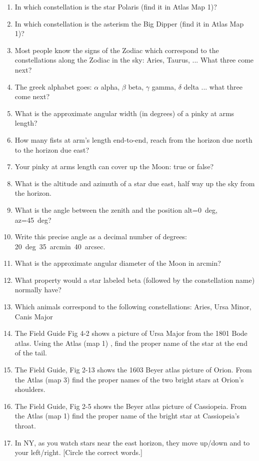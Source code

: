 \documentclass{article}
\begin{document}
\begin{enumerate} 
\item 
In which constellation is the star Polaris (find it in Atlas Map 1)?
\item
In which constellation is the asterism the Big Dipper (find it in
Atlas Map 1)?
\item
Most people know the signs of the Zodiac which correspond to the
constellations along the Zodiac in the sky: Aries, Taurus, ... What
three come next?
\item
The greek alphabet goes: $\alpha$ alpha, $\beta$ beta, $\gamma$ gamma,
$\delta$ delta ... what three come next?
\item
What is the approximate angular width (in degrees) of a pinky at arms
length?
\item
How many fists at arm's length end-to-end, reach from the horizon due
north to the horizon due east?
\item
Your pinky at arms length can cover up the Moon: true or false?
\item
What is the altitude and azimuth of a star due east, half way up the
sky from the horizon.
\item
What is the angle between the zenith and the position alt=0~deg,
az=45~deg?
\item
Write this precise angle as a decimal number of degrees: 20~deg\
35~arcmin\ 40~arcsec.
\item
What is the approximate angular diameter of the Moon in arcmin?
\item
What property would a star labeled beta (followed by the constellation
name) normally have?
\item
Which animals correspond to the following constellations: Aries, Ursa
Minor, Canis Major
\item 
The Field Guide Fig 4-2 shows a picture of Ursa Major from the 1801
Bode atlas.  Using the Atlas (map 1) , find the proper name of the
star at the end of the tail.
\item 
The Field Guide, Fig 2-13 shows the 1603 Beyer atlas picture of
Orion. From the Atlas (map 3) find the proper names of the two bright
stars at Orion's shoulders.
\item 
The Field Guide, Fig 2-5 shows the Beyer atlas picture of
Cassiopeia. From the Atlas (map 1) find the proper name of the bright
star at Cassiopeia's throat.
\item
In NY, as you watch stars near the east horizon, they move up/down and
to your left/right.  [Circle the correct words.]

\end{enumerate}
\end{document}
